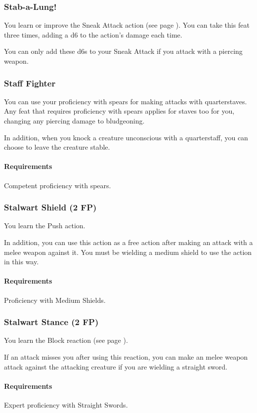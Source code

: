 \subsubsection{Stab-a-Lung!} \label{feat::stabalung}
    You learn or improve the Sneak Attack action (see page \pageref{act::sneakattack}).
    You can take this feat three times, adding a d6 to the action's damage each time.

    You can only add these d6s to your Sneak Attack if you attack with a piercing weapon.
\subsubsection{Staff Fighter} \label{feat::stafffighter}
    You can use your proficiency with spears for making attacks with quarterstaves.
    Any feat that requires proficiency with spears applies for staves too for you, changing any piercing damage to bludgeoning.

    In addition, when you knock a creature unconscious with a quarterstaff, you can choose to leave the creature stable.
    \paragraph{Requirements} Competent proficiency with spears.
\subsubsection{Stalwart Shield (2 FP)} \label{feat::stalwartshield}
    You learn the Push action.

    In addition, you can use this action as a free action after making an attack with a melee weapon against it.
    You must be wielding a medium shield to use the action in this way.
    \paragraph{Requirements} Proficiency with Medium Shields.
\subsubsection{Stalwart Stance (2 FP)} \label{feat::stalwartstance}
    You learn the Block reaction (see page \pageref{act::block}).

    If an attack misses you after using this reaction, you can make an melee weapon attack against the attacking creature if you are wielding a straight sword.
    \paragraph{Requirements} Expert proficiency with Straight Swords.

